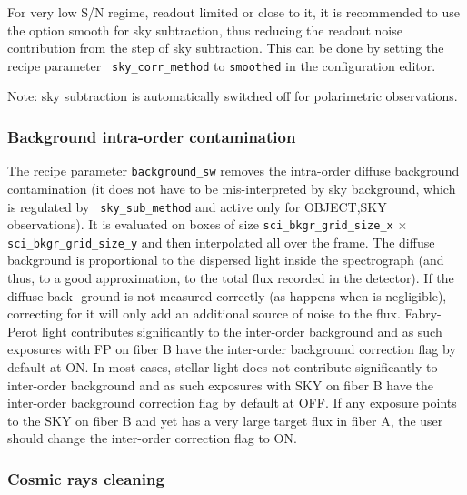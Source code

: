 For very low S/N regime, readout limited or close to it, it is
recommended to use the option smooth for sky subtraction, thus
reducing the readout noise contribution from the step of sky
subtraction. This can be done by setting the recipe parameter {\tt
  sky\_corr\_method} to {\tt smoothed} in the configuration editor.

Note: sky subtraction is automatically switched off for
polarimetric observations.

\subsubsection{Background intra-order contamination}

The recipe parameter {\tt background\_sw} removes the intra-order
diffuse background contamination (it does not have to be
mis-interpreted by sky background, which is regulated by {\tt
  sky\_sub\_method} and active only for OBJECT,SKY observations). It
is evaluated on boxes of size {\tt sci\_bkgr\_grid\_size\_x} $\times$
{\tt sci\_bkgr\_grid\_size\_y} and then interpolated all over the
frame. The diffuse background is proportional to the dispersed light
inside the spectrograph (and thus, to a good approximation, to the
total flux recorded in the detector). If the diffuse back- ground is
not measured correctly (as happens when is negligible), correcting for
it will only add an additional source of noise to the
flux. Fabry-Perot light contributes significantly to the inter-order
background and as such exposures with FP on fiber B have the
inter-order background correction flag by default at ON. In most
cases, stellar light does not contribute significantly to inter-order
background and as such exposures with SKY on fiber B have the
inter-order background correction flag by default at OFF. If any
exposure points to the SKY on fiber B and yet has a very large target
flux in fiber A, the user should change the inter-order correction
flag to ON.

\subsubsection{Cosmic rays cleaning}

